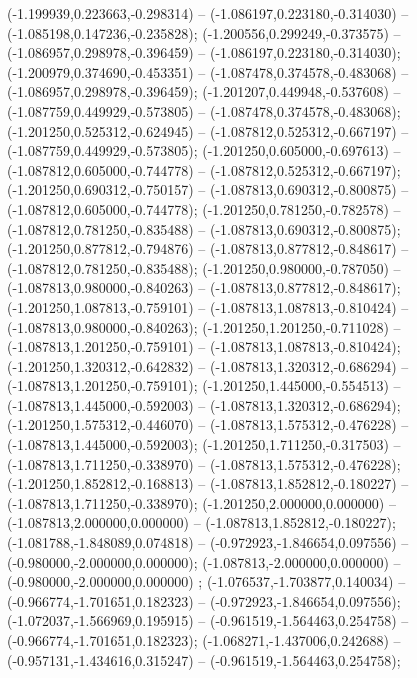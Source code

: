  (-1.199939,0.223663,-0.298314) -- (-1.086197,0.223180,-0.314030) -- (-1.085198,0.147236,-0.235828);
 (-1.200556,0.299249,-0.373575) -- (-1.086957,0.298978,-0.396459) -- (-1.086197,0.223180,-0.314030);
 (-1.200979,0.374690,-0.453351) -- (-1.087478,0.374578,-0.483068) -- (-1.086957,0.298978,-0.396459);
 (-1.201207,0.449948,-0.537608) -- (-1.087759,0.449929,-0.573805) -- (-1.087478,0.374578,-0.483068);
 (-1.201250,0.525312,-0.624945) -- (-1.087812,0.525312,-0.667197) -- (-1.087759,0.449929,-0.573805);
 (-1.201250,0.605000,-0.697613) -- (-1.087812,0.605000,-0.744778) -- (-1.087812,0.525312,-0.667197);
 (-1.201250,0.690312,-0.750157) -- (-1.087813,0.690312,-0.800875) -- (-1.087812,0.605000,-0.744778);
 (-1.201250,0.781250,-0.782578) -- (-1.087812,0.781250,-0.835488) -- (-1.087813,0.690312,-0.800875);
 (-1.201250,0.877812,-0.794876) -- (-1.087813,0.877812,-0.848617) -- (-1.087812,0.781250,-0.835488);
 (-1.201250,0.980000,-0.787050) -- (-1.087813,0.980000,-0.840263) -- (-1.087813,0.877812,-0.848617);
 (-1.201250,1.087813,-0.759101) -- (-1.087813,1.087813,-0.810424) -- (-1.087813,0.980000,-0.840263);
 (-1.201250,1.201250,-0.711028) -- (-1.087813,1.201250,-0.759101) -- (-1.087813,1.087813,-0.810424);
 (-1.201250,1.320312,-0.642832) -- (-1.087813,1.320312,-0.686294) -- (-1.087813,1.201250,-0.759101);
 (-1.201250,1.445000,-0.554513) -- (-1.087813,1.445000,-0.592003) -- (-1.087813,1.320312,-0.686294);
 (-1.201250,1.575312,-0.446070) -- (-1.087813,1.575312,-0.476228) -- (-1.087813,1.445000,-0.592003);
 (-1.201250,1.711250,-0.317503) -- (-1.087813,1.711250,-0.338970) -- (-1.087813,1.575312,-0.476228);
 (-1.201250,1.852812,-0.168813) -- (-1.087813,1.852812,-0.180227) -- (-1.087813,1.711250,-0.338970);
 (-1.201250,2.000000,0.000000) -- (-1.087813,2.000000,0.000000) -- (-1.087813,1.852812,-0.180227);
 (-1.081788,-1.848089,0.074818) -- (-0.972923,-1.846654,0.097556) -- (-0.980000,-2.000000,0.000000);
 (-1.087813,-2.000000,0.000000) -- (-0.980000,-2.000000,0.000000) ;
 (-1.076537,-1.703877,0.140034) -- (-0.966774,-1.701651,0.182323) -- (-0.972923,-1.846654,0.097556);
 (-1.072037,-1.566969,0.195915) -- (-0.961519,-1.564463,0.254758) -- (-0.966774,-1.701651,0.182323);
 (-1.068271,-1.437006,0.242688) -- (-0.957131,-1.434616,0.315247) -- (-0.961519,-1.564463,0.254758);
